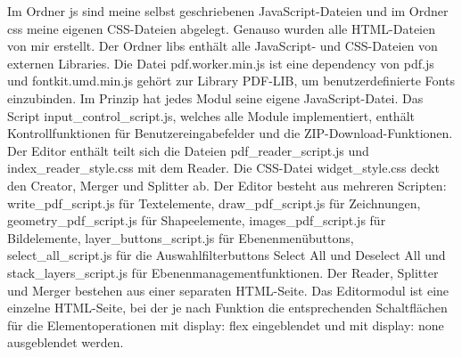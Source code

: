Im Ordner js sind meine selbst geschriebenen JavaScript-Dateien und im Ordner css meine eigenen CSS-Dateien abgelegt. Genauso wurden alle HTML-Dateien von mir erstellt. Der Ordner libs enthält alle JavaScript- und CSS-Dateien von externen Libraries. Die Datei pdf.worker.min.js ist eine dependency von pdf.js und fontkit.umd.min.js gehört zur Library PDF-LIB, um benutzerdefinierte Fonts einzubinden. Im Prinzip hat jedes Modul seine eigene JavaScript-Datei. Das Script input\_control\_script.js, welches alle Module implementiert, enthält Kontrollfunktionen für Benutzereingabefelder und die ZIP-Download-Funktionen. Der Editor enthält teilt sich die Dateien pdf\_reader\_script.js und index\_reader\_style.css mit dem Reader. Die CSS-Datei widget\_style.css deckt den Creator, Merger und Splitter ab. Der Editor besteht aus mehreren Scripten: write\_pdf\_script.js für Textelemente, draw\_pdf\_script.js für Zeichnungen, geometry\_pdf\_script.js für Shapeelemente, images\_pdf\_script.js für Bildelemente, layer\_buttons\_script.js für Ebenenmenübuttons, select\_all\_script.js für die Auswahlfilterbuttons Select All und Deselect All und stack\_layers\_script.js für Ebenenmanagementfunktionen. Der Reader, Splitter und Merger bestehen aus einer separaten HTML-Seite. Das Editormodul ist eine einzelne HTML-Seite, bei der je nach Funktion die entsprechenden Schaltflächen für die Elementoperationen mit display: flex eingeblendet und mit display: none ausgeblendet werden. 

